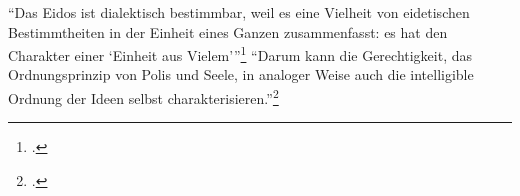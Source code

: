 \enquote{Das Eidos ist dialektisch bestimmbar, weil es eine Vielheit von eidetischen Bestimmtheiten in der Einheit eines Ganzen zusammenfasst: es hat den Charakter einer \enquote{Einheit aus Vielem}}\footcite[][S. 240]{halfwassenaufstieg2006}
\enquote{Darum kann die Gerechtigkeit, das Ordnungsprinzip von Polis und Seele, in analoger Weise auch die intelligible Ordnung der Ideen selbst charakterisieren.}\footcite[][S. 242]{halfwassenaufstieg2006}

